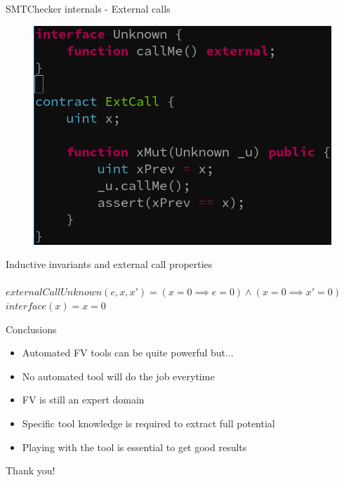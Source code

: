 \documentclass[aspectratio=169,10pt]{beamer}
\begin{document}
\begin{frame}[fragile]
\begin{center}
SMTChecker internals - External calls
\begin{figure}
	\includegraphics[scale=0.3]{images/extcall_pass_code}
\end{figure}
\end{center}
\end{frame}

\begin{frame}[fragile]
\begin{center}
Inductive invariants and external call properties\\
\;\\
$externalCallUnknown(e, x, x') = (x = 0 \implies e = 0) \land (x = 0 \implies x' = 0)$\\
$interface(x) = x = 0$
\end{center}
\end{frame}

\begin{frame}[fragile]
\begin{center}
Conclusions
\begin{itemize}
\item Automated FV tools can be quite powerful but...
\item No automated tool will do the job everytime
\item FV is still an expert domain
\item Specific tool knowledge is required to extract full potential
\item Playing with the tool is essential to get good results
\end{itemize}
\end{center}
\end{frame}

\begin{frame}
\begin{center}
Thank you!
\end{center}
\end{frame}
 
\end{document}
